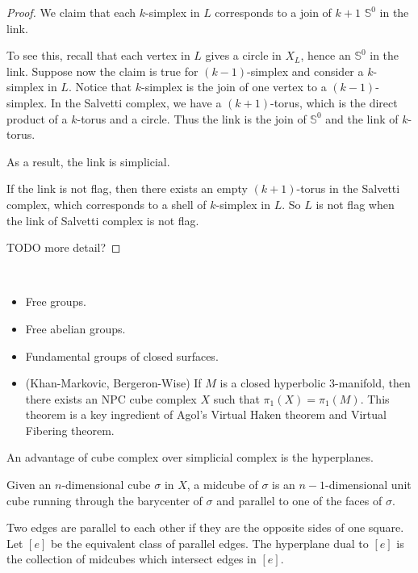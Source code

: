 \begin{proof}
    We claim that each \(k\)-simplex in \(L\) corresponds to a join of \(k+1\) \(\mathbb{S}^0\) in the link. 

    To see this, recall that each vertex in \(L\) gives a circle in \(X_L\), hence an \(\mathbb{S}^0\) in the link. Suppose now the claim is true for \((k-1)\)-simplex and consider a \(k\)-simplex in \(L\). Notice that \(k\)-simplex is the join of one vertex to a \((k-1)\)-simplex. In the Salvetti complex, we have a \((k+1)\)-torus, which is the direct product of a \(k\)-torus and a circle. Thus the link is the join of \(\mathbb{S}^0\) and the link of \(k\)-torus.

    As a result, the link is simplicial.

    If the link is not flag, then there exists an empty \((k+1)\)-torus in the Salvetti complex, which corresponds to a shell of \(k\)-simplex in \(L\). So \(L\) is not flag when the link of Salvetti complex is not flag.

    TODO more detail?
\end{proof}

\begin{example} ~\\
    \begin{itemize}
        \item Free groups.
        \item Free abelian groups.
        \item Fundamental groups of closed surfaces.
        \item (Khan-Markovic, Bergeron-Wise) If \(M\) is a closed hyperbolic \(3\)-manifold, then there exists an NPC cube complex \(X\) such that \(\pi_1(X) = \pi_1(M)\). This theorem is a key ingredient of Agol's Virtual Haken theorem and Virtual Fibering theorem. 
    \end{itemize}
\end{example}

An advantage of cube complex over simplicial complex is the hyperplanes.

\begin{definition}
    \label{def:hyperplane-of-cube-complex}
    Given an \(n\)-dimensional cube \(\sigma\) in \(X\), a midcube of \(\sigma\) is an \(n-1\)-dimensional unit cube running through the barycenter of \(\sigma\) and parallel to one of the faces of \(\sigma\). 
    
    Two edges are parallel to each other if they are the opposite sides of one square. Let \([e]\) be the equivalent class of parallel edges.
    The hyperplane dual to \([e]\) is the collection of midcubes which intersect edges in \([e]\).
\end{definition}

